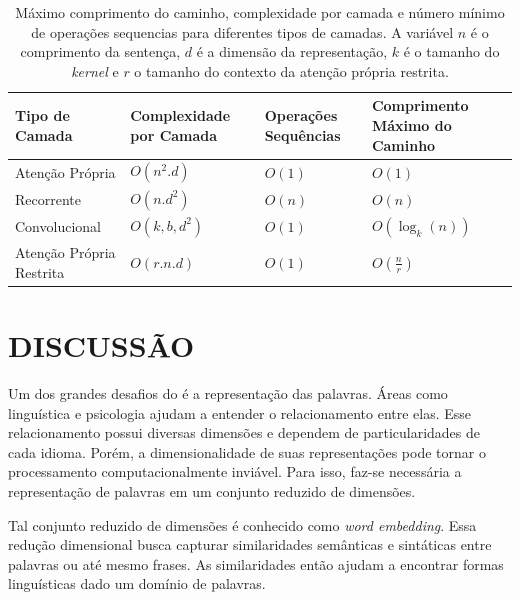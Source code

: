 \begin{table}[ht!]
    \caption[Desempenho de diferentes modelos de aprendizado.]{Máximo comprimento do caminho, complexidade por camada e número mínimo de operações sequencias para diferentes tipos de camadas. A variável $n$ é o comprimento da sentença, $d$ é a dimensão da representação, $k$ é o tamanho do \textit{kernel} e $r$ o tamanho do contexto da atenção própria restrita.}
    \label{table:transformer-comparison}
    \centering
    \begin{tabular}{p{4.2cm}|p{3cm}|p{2.5cm}|p{4cm}}
        \hline
        Tipo de Camada              & Complexidade por Camada   & Operações Sequências  & Comprimento Máximo do Caminho \\
        \hline
        Atenção Própria             & $O(n^2.d)$                & $O(1)$                & $O(1)$ \\
        \hline
        Recorrente                  & $O(n.d^2)$                & $O(n)$                & $O(n)$ \\
        \hline
        Convolucional               & $O(k,b,d^2)$              & $O(1)$                & $O(\log_k(n))$ \\
        \hline
        Atenção Própria Restrita    & $O(r.n.d)$                & $O(1)$                & $O(\frac{n}{r})$ \\
        \hline
    \end{tabular}
\end{table}

\section{DISCUSSÃO}
\label{sec:pln-discussion}

Um dos grandes desafios do  é a representação das palavras. Áreas como linguística e psicologia ajudam a entender o relacionamento entre elas. Esse relacionamento possui diversas dimensões e dependem de particularidades de cada idioma. Porém, a dimensionalidade de suas representações pode tornar o processamento computacionalmente inviável. Para isso, faz-se necessária a representação de palavras em um conjunto reduzido de dimensões.

Tal conjunto reduzido de dimensões é conhecido como \textit{word embedding}. Essa redução dimensional busca capturar similaridades semânticas e sintáticas entre palavras ou até mesmo frases. As similaridades então ajudam a encontrar formas linguísticas dado um domínio de palavras.

